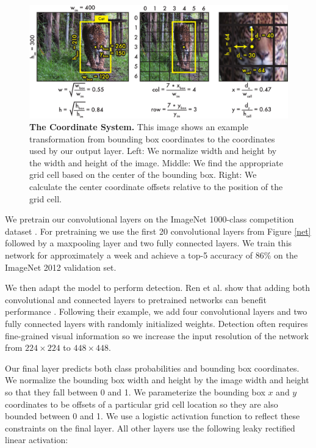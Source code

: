 \documentclass{article} %
\begin{document}
   \begin{figure}[t]
      \centering
        \includegraphics[width=.8\linewidth]{transform}
      \caption{\textbf{The Coordinate System.} This image shows an example transformation from bounding box coordinates to the coordinates used by our output layer. Left: We normalize width and height by the width and height of the image. Middle: We find the appropriate grid cell based on the center of the bounding box. Right: We calculate the center coordinate offsets relative to the position of the grid cell.}
      \label{transform}
   \end{figure}

We pretrain our convolutional layers on the ImageNet 1000-class competition dataset \cite{ILSVRC15}. For pretraining we use the first 20 convolutional layers from Figure \ref{net} followed by a maxpooling layer and two fully connected layers. We train this network for approximately a week and achieve a top-5 accuracy of 86\% on the ImageNet 2012 validation set.

We then adapt the model to perform detection. Ren et al. show that adding both convolutional and connected layers to pretrained networks can benefit performance \cite{DBLP:journals/corr/RenHGZ015}. Following their example, we add four convolutional layers and two fully connected layers with randomly initialized weights. Detection often requires fine-grained visual information so we increase the input resolution of the network from $224 \times 224$ to $448 \times 448$.

Our final layer predicts both class probabilities and bounding box coordinates. We normalize the bounding box width and height by the image width and height so that they fall between 0 and 1. We parameterize the bounding box $x$ and $y$ coordinates to be offsets of a particular grid cell location so they are also bounded between 0 and 1. We use a logistic activation function to reflect these constraints on the final layer. All other layers use the following leaky rectified linear activation:
\end{document}
